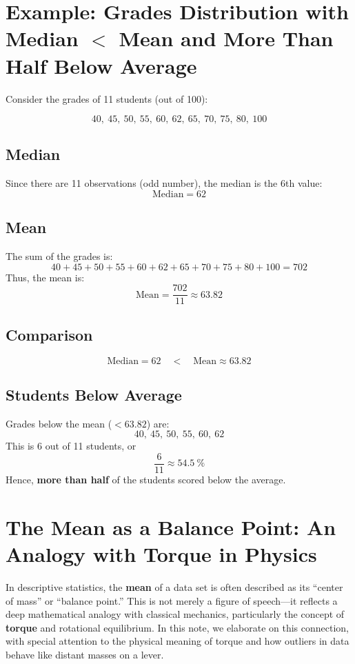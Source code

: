 \documentclass{article}
\begin{document}
\Large

\section*{Example: Grades Distribution with Median $<$ Mean and More Than Half Below Average}

Consider the grades of 11 students (out of 100):

\[
40,\ 45,\ 50,\ 55,\ 60,\ 62,\ 65,\ 70,\ 75,\ 80,\ 100
\]

\subsection*{Median}
Since there are 11 observations (odd number), the median is the 6th value:
\[
\text{Median} = 62
\]

\subsection*{Mean}
The sum of the grades is:
\[
40 + 45 + 50 + 55 + 60 + 62 + 65 + 70 + 75 + 80 + 100 = 702
\]
Thus, the mean is:
\[
\text{Mean} = \frac{702}{11} \approx 63.82
\]

\subsection*{Comparison}
\[
\text{Median} = 62 \quad < \quad \text{Mean} \approx 63.82
\]

\subsection*{Students Below Average}
Grades below the mean ($< 63.82$) are:
\[
40,\ 45,\ 50,\ 55,\ 60,\ 62
\]
This is 6 out of 11 students, or
\[
\frac{6}{11} \approx \SI{54.5}{\%}
\]
Hence, \textbf{more than half} of the students scored below the average.






\section{The Mean as a Balance Point: An Analogy with Torque in Physics}

In descriptive statistics, the \textbf{mean} of a data set is often described as its ``center of mass'' or ``balance point.'' This is not merely a figure of speech—it reflects a deep mathematical analogy with classical mechanics, particularly the concept of \textbf{torque} and rotational equilibrium. In this note, we elaborate on this connection, with special attention to the physical meaning of torque and how outliers in data behave like distant masses on a lever.
\end{document}
